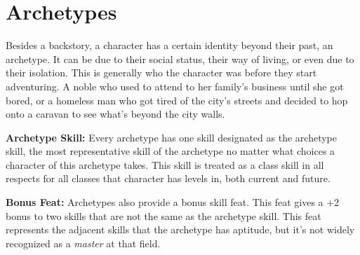 \section{Archetypes}
Besides a backstory, a character has a certain identity beyond their past, an archetype. It can be due to their social status, their way of living, or even due to their isolation. This is generally who the character was before they start adventuring. A noble who used to attend to her family's business until she got bored, or a homeless man who got tired of the city's streets and decided to hop onto a caravan to see what's beyond the city walls.

\textbf{Archetype Skill:} Every archetype has one skill designated as the archetype skill, the most representative skill of the archetype no matter what choices a character of this archetype takes. This skill is treated as a class skill in all respects for all classes that character has levels in, both current and future.

\textbf{Bonus Feat:} Archetypes also provide a bonus skill feat. This feat gives a +2 bonus to two skills that are not the same as the archetype skill. This feat represents the adjacent skills that the archetype has aptitude, but it's not widely recognized as a \emph{master} at that field.

















	
